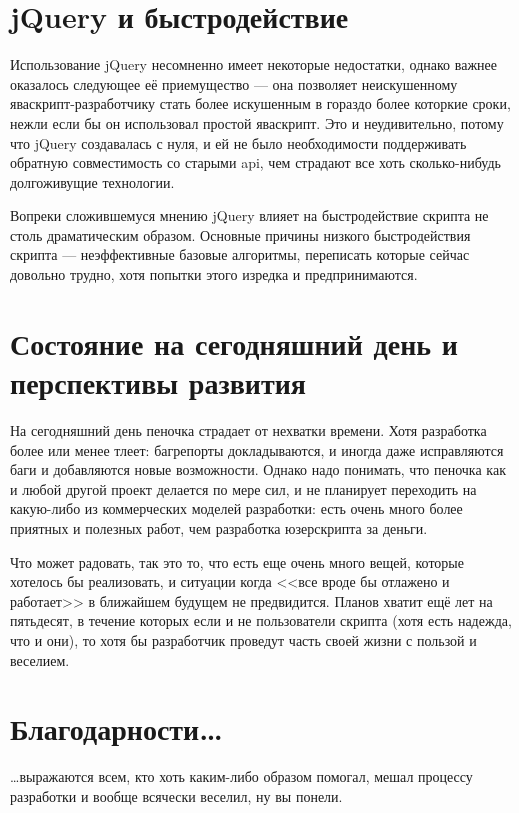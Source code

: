 \documentclass[12pt,a4paper]{article}
\begin{document}
\section*{jQuery и быстродействие}

Использование jQuery несомненно имеет некоторые недостатки, однако важнее оказалось следующее её приемущество --- она позволяет неискушенному яваскрипт-разработчику стать более искушенным в гораздо более которкие сроки, нежли если бы он использовал простой яваскрипт. Это и неудивительно, потому что jQuery создавалась с нуля, и ей не было необходимости поддерживать обратную совместимость со старыми api, чем страдают все хоть сколько-нибудь долгоживущие технологии.

Вопреки сложившемуся мнению jQuery влияет на быстродействие скрипта не столь драматическим образом. Основные причины низкого быстродействия скрипта --- неэффективные базовые алгоритмы, переписать которые сейчас довольно трудно, хотя попытки этого изредка и предпринимаются.

\section*{Состояние на сегодняшний день и перспективы развития}

На сегодняшний день пеночка страдает от нехватки времени. Хотя разработка более или менее тлеет: багрепорты докладываются, и иногда даже исправляются баги и добавляются новые возможности. Однако надо понимать, что пеночка как и любой другой проект делается по мере сил, и не планирует переходить на какую-либо из коммерческих моделей разработки: есть очень много более приятных и полезных работ, чем разработка юзерскрипта за деньги.

Что может радовать, так это то, что есть еще очень много вещей, которые хотелось бы реализовать, и ситуации когда <<все вроде бы отлажено и работает>> в ближайшем будущем не предвидится. Планов хватит ещё лет на пятьдесят, в течение которых если и не пользователи скрипта (хотя есть надежда, что и они), то хотя бы разработчик проведут часть своей жизни с пользой и веселием.

\section*{Благодарности\ldots}

\ldots выражаются всем, кто хоть каким-либо образом помогал, мешал процессу разработки и вообще всячески веселил, ну вы понели.
\end{document}
